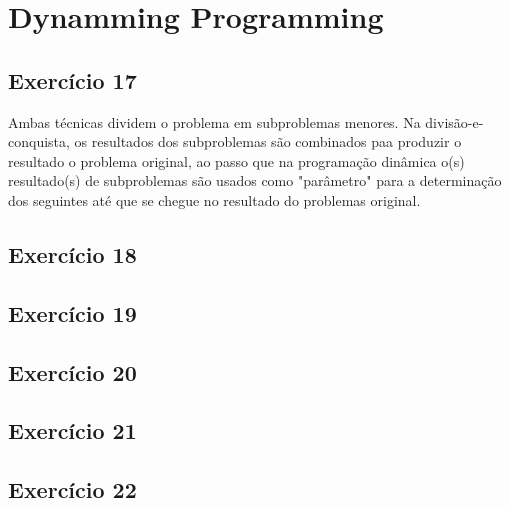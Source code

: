 \section{Dynamming Programming}\label{sec:dynamic_programming}

\subsection{Exercício 17}\label{sec:exer17}
Ambas técnicas dividem o problema em subproblemas menores. Na divisão-e-conquista,
os resultados dos subproblemas são combinados paa produzir o resultado o problema
original, ao passo que na programação dinâmica o(s) resultado(s) de subproblemas
são usados como "parâmetro" para a determinação dos seguintes até que se chegue
no resultado do problemas original.

\subsection{Exercício 18}\label{sec:exer18}

\subsection{Exercício 19}\label{sec:exer19}

\subsection{Exercício 20}\label{sec:exer20}

\subsection{Exercício 21}\label{sec:exer21}

\subsection{Exercício 22}\label{sec:exer22}
